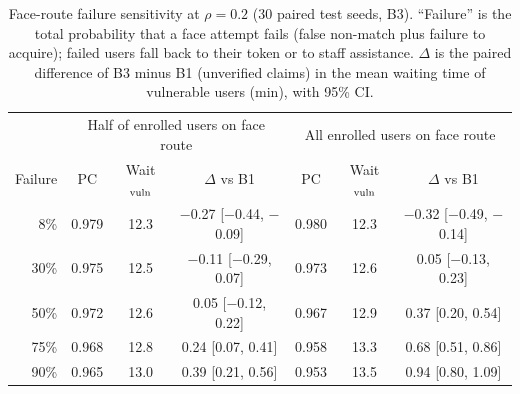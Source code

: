 \begin{table}[!t]
\caption{Face-route failure sensitivity at $\rho=0.2$ (30 paired test seeds, B3). ``Failure'' is the total probability that a face attempt fails (false non-match plus failure to acquire); failed users fall back to their token or to staff assistance. $\Delta$ is the paired difference of B3 minus B1 (unverified claims) in the mean waiting time of vulnerable users (min), with 95\% CI.}
\label{tabface}
\centering\small\setlength{\tabcolsep}{3.2pt}
\begin{tabular}{@{}rcccccc@{}}
\hline
 & \multicolumn{3}{c}{Half of enrolled users on face route} & \multicolumn{3}{c}{All enrolled users on face route}\\
Failure & PC & Wait$_{\rm vuln}$ & $\Delta$ vs B1 & PC & Wait$_{\rm vuln}$ & $\Delta$ vs B1\\\hline
8\% & 0.979 & 12.3 & $-$0.27 [$-$0.44, $-$0.09] & 0.980 & 12.3 & $-$0.32 [$-$0.49, $-$0.14]\\
30\% & 0.975 & 12.5 & $-$0.11 [$-$0.29, 0.07] & 0.973 & 12.6 & 0.05 [$-$0.13, 0.23]\\
50\% & 0.972 & 12.6 & 0.05 [$-$0.12, 0.22] & 0.967 & 12.9 & 0.37 [0.20, 0.54]\\
75\% & 0.968 & 12.8 & 0.24 [0.07, 0.41] & 0.958 & 13.3 & 0.68 [0.51, 0.86]\\
90\% & 0.965 & 13.0 & 0.39 [0.21, 0.56] & 0.953 & 13.5 & 0.94 [0.80, 1.09]\\
\hline\end{tabular}
\end{table}
